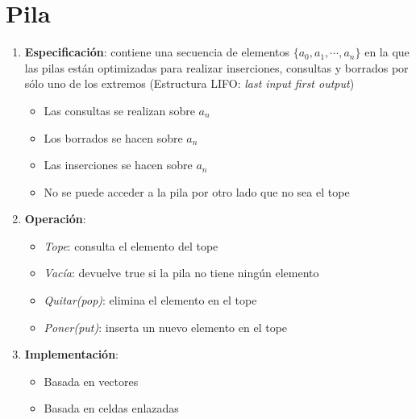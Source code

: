 \documentclass[10pt,a4paper,spanish]{report}
\begin{document}
\section{\textcolor[rgb]{0.2,0.5,0.5}Pila}
\begin{enumerate}[$\spadesuit$]
\item \textbf{\textcolor[rgb]{0.2,0.5,0.5}{Especificación}}: contiene una secuencia de elementos $\{a_{0}, a_{1}, \cdots, a_{n}\}$ en la que las pilas están optimizadas para realizar inserciones, consultas y borrados por sólo uno de los extremos (Estructura LIFO: \textit{\textcolor[rgb]{0.2,0.5,0.5}{last input first output}})
\begin{itemize}
    \item Las consultas se realizan sobre $a_{n}$
    \item Los borrados se hacen sobre $a_{n}$
    \item Las inserciones se hacen sobre $a_{n}$
    \item No se puede acceder a la pila por otro lado que no sea el tope
\end{itemize}
\item \textbf{\textcolor[rgb]{0.2,0.5,0.5}{Operación}}:
\begin{itemize}
    \item \textit{\textcolor[rgb]{0.2,0.5,0.5}{Tope}}: consulta el elemento del tope
    \item \textit{\textcolor[rgb]{0.2,0.5,0.5}{Vacía}}: devuelve true si la pila no tiene ningún elemento
    \item \textit{\textcolor[rgb]{0.2,0.5,0.5}{Quitar(pop)}}: elimina el elemento en el tope
    \item \textit{\textcolor[rgb]{0.2,0.5,0.5}{Poner(put)}}: inserta un nuevo elemento en el tope
\end{itemize}
\item \textbf{\textcolor[rgb]{0.2,0.5,0.5}{Implementación}}:
\begin{itemize}
    \item Basada en vectores
    \item Basada en celdas enlazadas
\end{itemize}
\end{enumerate}
\end{document}
